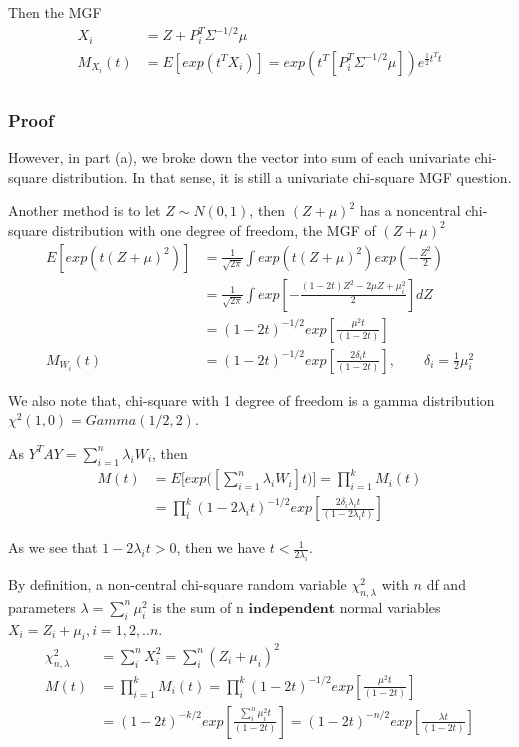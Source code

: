 Then the MGF
 \begin{align*}
 	X_i &= Z + P_i^T \Sigma^{-1/2} \mu \\
	M_{X_i}(t)	&= E[ exp(t^T X_i) ]= exp(t^T [P_i^T \Sigma^{-1/2} \mu]) e^{\frac{1}{2} t^T t} \\
\end{align*}  



\subsubsection{Proof}	

	However, in part (a), we broke down the vector into sum of each univariate chi-square distribution. In that sense, it is still a univariate chi-square MGF question.
	
	Another method is to let $Z \sim N(0,1)$, then $(Z+\mu)^2$ has a noncentral chi-square distribution with one degree of freedom, the MGF of $(Z+\mu)^2$
	\begin{align*}
		E[exp(t (Z+\mu)^2)] &=\frac{1}{\sqrt{2\pi}} \int exp(t (Z+\mu)^2)  exp(-\frac{Z^2}{2})\\
		&= \frac{1}{\sqrt{2\pi}} \int exp[- \frac{(1-2t)Z^2 - 2\mu Z + \mu_i^2}{2}] dZ\\
		&= (1-2t)^{-1/2} exp[\frac{\mu^2 t}{(1-2t)}] \\
		M_{W_i}(t) &= (1-2t)^{-1/2} exp[\frac{2 \delta_i t}{(1-2t)}], \qquad \delta_i = \frac{1}{2} \mu_i^2
	\end{align*} 

	We also note that, chi-square with 1 degree of freedom is a gamma distribution $\chi^2(1,0) = Gamma(1/2, 2)$.
	
	As $Y^TAY = \sum_{i=1}^n \lambda_i W_i$, then 
\begin{align*}
	M(t) &= E\Big[exp \Big( [\sum_{i=1}^n \lambda_i W_i ] t\Big) \Big] = \prod_{i=1}^k M_i(t) \\
	&= \prod_i^k (1-2 \lambda_i t)^{-1/2} exp[\frac{2 \delta_i \lambda_i t}{(1-2 \lambda_i t)}] 
\end{align*}  	
	
	As we see that $1-2 \lambda_i t > 0$, then we have $t < \frac{1}{2 \lambda_i}$.
	
	
	By definition, a non-central chi-square random variable $\chi^2_{n,\lambda}$ with $n$ df and parameters $\lambda = \sum_i^n \mu_i^2$ is the sum of n $\textbf{independent} $ normal variables $X_i = Z_i + \mu_i, i=1,2,..n$. 
	\begin{align*}
		\chi^2_{n,\lambda} &= \sum_i^n X_i^2 = \sum_i^n (Z_i + \mu_i)^2 \\
		M(t) &= \prod_{i=1}^k M_i(t) =\prod_i^k (1-2t)^{-1/2} exp[\frac{\mu^2 t}{(1-2t)}] \\
		&= (1-2t)^{-k/2} exp[\frac{\sum_i^n \mu_i^2 t}{(1-2t)}] =(1-2t)^{-n/2} exp[\frac{\lambda t}{(1-2t)}]
	\end{align*}  
	

